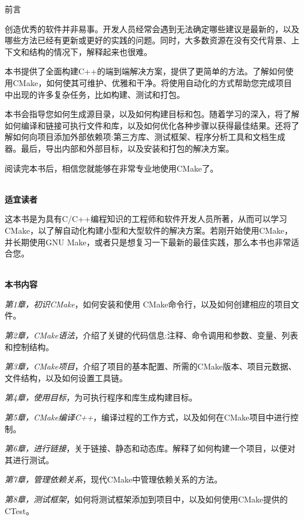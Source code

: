 \begin{flushright}
 前言
\end{flushright}

创造优秀的软件并非易事。开发人员经常会遇到无法确定哪些建议是最新的，以及哪些方法已经有更新或更好的实践的问题。同时，大多数资源在没有交代背景、上下文和结构的情况下，解释起来也很难。

本书提供了全面构建C++的端到端解决方案，提供了更简单的方法。了解如何使用CMake，如何使其可维护、优雅和干净。将使用自动化的方式帮助您完成项目中出现的许多复杂任务，比如构建、测试和打包。

本书会指导您如何生成源目录，以及如何构建目标和包。随着学习的深入，将了解如何编译和链接可执行文件和库，以及如何优化各种步骤以获得最佳结果。还将了解如何向项目添加外部依赖项:第三方库、测试框架、程序分析工具和文档生成器。最后，导出内部和外部目标，以及安装和打包的解决方案。

阅读完本书后，相信您就能够在非常专业地使用CMake了。

\hspace*{\fill} \\ %
\textbf{适宜读者}

这本书是为具有C/C++编程知识的工程师和软件开发人员所著，从而可以学习CMake，以了解自动化构建小型和大型软件的解决方案。若刚开始使用CMake，并长期使用GNU Make，或者只是想复习一下最新的最佳实践，那么本书也非常适合您。

\hspace*{\fill} \\ %
\textbf{本书内容}

\textit{第1章，初识CMake}，如何安装和使用 CMake命令行，以及如何创建相应的项目文件。

\textit{第2章，CMake语法}，介绍了关键的代码信息:注释、命令调用和参数、变量、列表和控制结构。

\textit{第3章，CMake项目}，介绍了项目的基本配置、所需的CMake版本、项目元数据、文件结构，以及如何设置工具链。

\textit{第4章，使用目标}，为可执行程序和库生成构建目标。

\textit{第5章，CMake编译C++}，编译过程的工作方式，以及如何在CMake项目中进行控制。

\textit{第6章，进行链接}，关于链接、静态和动态库。解释了如何构建一个项目，以便对其进行测试。

\textit{第7章，管理依赖关系}，现代CMake中管理依赖关系的方法。

\textit{第8章，测试框架}，如何将测试框架添加到项目中，以及如何使用CMake提供的CTest。

